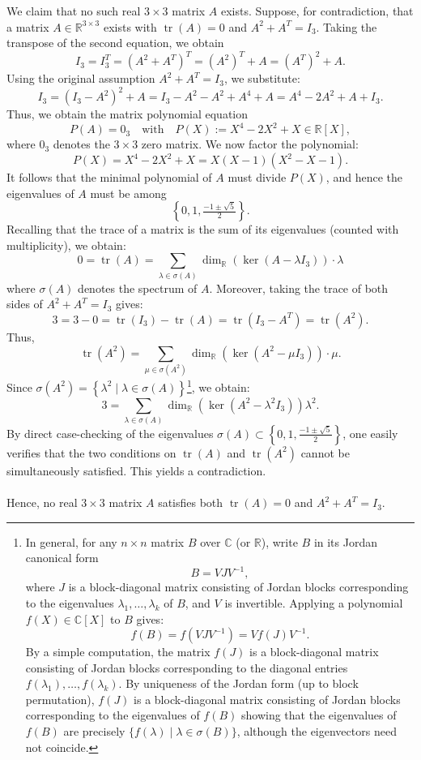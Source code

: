 \documentclass[11pt, a4paper, oneside]{article}
\theoremstyle{remark}
\theoremstyle{lemma}
\begin{document}
We claim that no such real $3 \times 3$ matrix $A$ exists. Suppose, for contradiction, that a matrix $A \in \mathbb{R}^{3\times 3}$ exists with $\operatorname{tr}(A) = 0$ and $A^2 + A^T = I_3$.
Taking the transpose of the second equation, we obtain
\[
I_3 = I_3^T = \left(A^2 + A^T\right)^T = \left(A^2\right)^T + A
= \left(A^T\right)^2 + A.
\]
Using the original assumption $A^2 + A^T = I_3$, we substitute:
\[
I_3 = \left(I_3 - A^2\right)^2 + A
= I_3 - A^2 - A^2 + A^4 + A
= A^4 - 2A^2 + A + I_3.
\]
Thus, we obtain the matrix polynomial equation
\[
P(A) = 0_3
\quad\text{with}\quad P(X) := X^4 - 2X^2 + X \in \mathbb{R}[X],
\]
where $0_3$ denotes the $3\times 3$ zero matrix. We now factor the polynomial:
\[
P(X) = X^4 - 2X^2 + X
= X(X-1)\left(X^2 - X - 1\right).
\]
It follows that the minimal polynomial of $A$ must divide $P(X)$, and hence the eigenvalues of $A$ must be among
\[
\left\{0, 1, \tfrac{-1\pm\sqrt{5}}{2}\right\}.
\]
Recalling that the trace of a matrix is the sum of its eigenvalues (counted with multiplicity), we obtain:
\[
0 = \operatorname{tr}(A)
= \sum_{\lambda \in \sigma(A)} \dim_{\mathbb{R}}(\ker(A - \lambda I_3)) \cdot \lambda
\]
where $\sigma(A)$ denotes the spectrum of $A$. Moreover, taking the trace of both sides of $A^2 + A^T = I_3$ gives:
\[
3 = 3 - 0 = \operatorname{tr}(I_3) - \operatorname{tr}(A)
= \operatorname{tr}\left(I_3 - A^T\right)
= \operatorname{tr}\left(A^2\right).
\]
Thus,
\[
\operatorname{tr}(A^2)
= \sum_{\mu \in \sigma(A^2)} \dim_{\mathbb{R}}\left(\ker\left(A^2 - \mu I_3\right)\right) \cdot \mu.
\]
Since $\sigma\left(A^2\right) = \left\{\lambda^2 \mid \lambda \in \sigma(A)\right\}$\footnote{In general, for any $n \times n$ matrix $B$ over $\mathbb{C}$ (or $\mathbb{R}$), write $B$ in its Jordan canonical form
\[
B = V J V^{-1},
\]
where $J$ is a block-diagonal matrix consisting of Jordan blocks corresponding to the eigenvalues $\lambda_1, \dots, \lambda_k$ of $B$, and $V$ is invertible. Applying a polynomial $f(X) \in \mathbb{C}[X]$ to $B$ gives:
\[
f(B)
=
f(V J V^{-1})
=
V f(J) V^{-1}.
\]
By a simple computation, the matrix $f(J)$ is a block-diagonal matrix consisting of Jordan blocks corresponding to the diagonal entries $f(\lambda_1), \dots, f(\lambda_k)$. By uniqueness of the Jordan form (up to block permutation), $f(J)$ is a block-diagonal matrix consisting of Jordan blocks corresponding to the eigenvalues of $f(B)$ showing that the eigenvalues of $f(B)$ are precisely $\{ f(\lambda) \mid \lambda \in \sigma(B)\}$, although the eigenvectors need not coincide.},
we obtain:
\[
3 = \sum_{\lambda \in \sigma(A)} \dim_{\mathbb{R}}\left(\ker\left(A^2 - \lambda^2 I_3\right)\right) \lambda^2.
\]
By direct case-checking of the eigenvalues $\sigma(A) \subset \left\{0, 1, \frac{-1\pm\sqrt{5}}{2}\right\}$, one easily verifies that the two conditions on $\operatorname{tr}(A)$ and $\operatorname{tr}\left(A^2\right)$ cannot be simultaneously satisfied. This yields a contradiction.
\\\\
Hence, no real $3 \times 3$ matrix $A$ satisfies both $\operatorname{tr}(A) = 0$ and $A^2 + A^T = I_3$.
\end{document}
